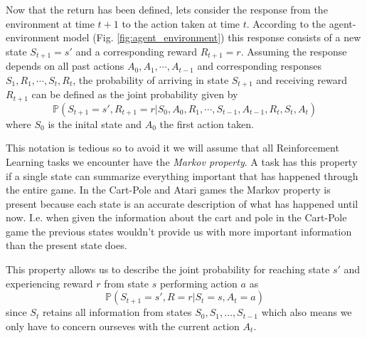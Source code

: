 \documentclass[11pt]{article}
\begin{document}
Now that the return has been defined, lets consider the response from the environment at time $t + 1$
to the action taken at time $t$.
According to the agent-environment model (Fig. \ref{fig:agent_environment}) this response consists
of a new state $S_{t+1} = s'$ and a corresponding reward $R_{t+1} = r$.
Assuming the response depends on all past actions $A_{0}, A_{1}, \cdots, A_{t-1}$ and
corresponding responses $S_{1}, R_{1}, \cdots, S_{t}, R_{t}$, the probability
of arriving in state $S_{t+1}$ and receiving reward $R_{t+1}$ can be defined as the
joint probability given by
\begin{equation}
    \mathds{P}(S_{t+1} = s', R_{t+1} = r | S_0, A_0, R_1, \cdots, S_{t-1}, A_{t-1}, R_{t}, S_{t}, A_{t})
\end{equation}
where $S_0$ is the inital state and $A_0$ the first action taken.

This notation is tedious so to avoid it we will assume that all Reinforcement Learning tasks
we encounter have the \textit{Markov property}.
A task has this property if a single state can summarize everything important that
has happened through the entire game.
In the Cart-Pole and Atari games the Markov property is present because each state is
an accurate description of what has happened until now.
I.e. when given the information about the cart and pole in the Cart-Pole game
the previous states wouldn't provide us with more important
information than the present state does.

This property allows us to describe the joint probability for reaching state $s'$ and
experiencing reward $r$ from state $s$ performing action $a$ as
\begin{equation}\label{joint_prob}
    \mathds{P}(S_{t+1} = s', R = r | S_t = s, A_t = a)
\end{equation}
since $S_t$ retains all information from states $S_0, S_1, \dots, S_{t-1}$
which also means we only have to concern ourseves with the current action $A_t$.
\end{document}
